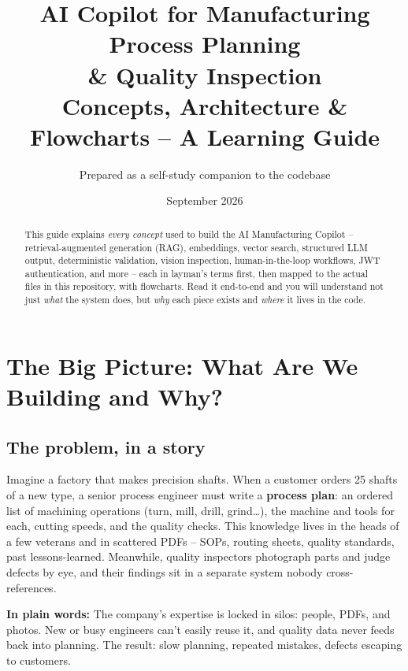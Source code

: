\documentclass[11pt,a4paper]{article}
\title{\vspace{-1cm}\textbf{AI Copilot for Manufacturing Process Planning\\\& Quality Inspection}\\[4pt]
\large Concepts, Architecture \& Flowcharts -- A Learning Guide}
\author{Prepared as a self-study companion to the codebase}
\date{September 2026}
\newcommand{\layman}[1]{\par\medskip\noindent\textcolor{layman}{\textbf{In plain words:}} #1\par\smallskip}
\begin{document}
\maketitle
\thispagestyle{empty}

\begin{abstract}
\noindent This guide explains \emph{every concept} used to build the AI Manufacturing
Copilot -- retrieval-augmented generation (RAG), embeddings, vector search, structured
LLM output, deterministic validation, vision inspection, human-in-the-loop workflows,
JWT authentication, and more -- each in layman's terms first, then mapped to the actual
files in this repository, with flowcharts. Read it end-to-end and you will understand
not just \emph{what} the system does, but \emph{why} each piece exists and \emph{where}
it lives in the code.
\end{abstract}

\tableofcontents
\newpage

\section{The Big Picture: What Are We Building and Why?}

\subsection{The problem, in a story}
Imagine a factory that makes precision shafts. When a customer orders 25 shafts of a new
type, a senior process engineer must write a \textbf{process plan}: an ordered list of
machining operations (turn, mill, drill, grind\dots), the machine and tools for each,
cutting speeds, and the quality checks. This knowledge lives in the heads of a few
veterans and in scattered PDFs -- SOPs, routing sheets, quality standards, past
lessons-learned. Meanwhile, quality inspectors photograph parts and judge defects by
eye, and their findings sit in a separate system nobody cross-references.

\layman{The company's expertise is locked in silos: people, PDFs, and photos. New or
busy engineers can't easily reuse it, and quality data never feeds back into planning.
The result: slow planning, repeated mistakes, defects escaping to customers.}
\end{document}
